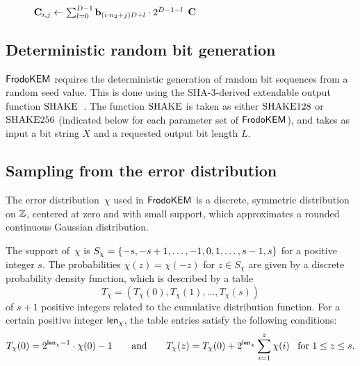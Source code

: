 \documentclass{iacrcc}
\begin{document}
\begin{figure}[h!]
\begin{minipage}[t]{0.5\textwidth}
\begin{algorithm}[H]
\vspace{-0.5cm}
\begin{algorithmic}[1]
    \STATE $\mathbf{C}_{i,j} \gets \sum_{l=0}^{D-1}\mathbf{b}_{(i\cdot n_2  + j)D+l}\cdot 2^{D-1-l}$
    \ENDFOR
    \ENDFOR
    \RETURN $\mathbf{C}$
\end{algorithmic}
\end{algorithm}
\end{minipage}
\end{figure}

\subsection{Deterministic random bit generation}\label{sec:rbg}

$\textsf{\upshape\mdseries FrodoKEM}$ requires the deterministic generation of random bit
sequences from a random seed value. This is done using the
SHA-3-derived extendable output function
$\textrm{\upshape\mdseries SHAKE}$~\cite{dworkin2015sha}. The function $\textrm{\upshape\mdseries SHAKE}$ is taken as
either $\textrm{\upshape\mdseries SHAKE}128$ or $\textrm{\upshape\mdseries SHAKE}256$ (indicated below for each
parameter set of $\textsf{\upshape\mdseries FrodoKEM}$), and takes as input a bit string $X$ and a
requested output bit length $L$.

\subsection{Sampling from the error distribution}\label{sec:sampling}

The error distribution~$\chi$ used in $\textsf{\upshape\mdseries FrodoKEM}$ is a discrete,
symmetric distribution on $\mathbb{Z}$, centered at zero and with small
support, which approximates a rounded continuous Gaussian
distribution.

The support of~$\chi$ is
$S_{\chi}=\{-s, -s+1, \dots, -1, 0, 1, \dots, s-1, s\}$ for a
positive integer $s$. The probabilities $\chi(z) = \chi(-z)$ for
$z \in S_{\chi}$ are given by a discrete probability density function,
which is described by a table
\[ T_{\chi} = (T_{\chi}(0), T_{\chi}(1), \dots, T_{\chi}(s)) \] of
$s+1$ positive integers related to the cumulative distribution function.  For a
certain positive integer ${\mathsf{len}_{\chi}}$, the table entries satisfy the
following conditions:
\[ T_{\chi}(0) = 2^{{\mathsf{len}_{\chi}}-1}\cdot \chi(0)-1 \quad\quad \textrm{and} \quad\quad
  T_{\chi}(z) = T_{\chi}(0) + 2^{{\mathsf{len}_{\chi}}}\sum_{i=1}^z\chi(i) \enspace \textrm{ for
  } 1 \leq z \leq s. \]
\end{document}
